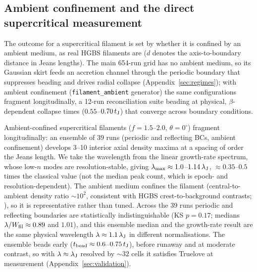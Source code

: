 \documentclass[usenatbib,twoside,twocolumn]{mnras}
\begin{document}
\subsection{Ambient confinement and the direct supercritical measurement}
\label{sec:modecompetition}

The outcome for a supercritical filament is set by whether it is confined by an ambient medium, as real HGBS filaments are ($d$ denotes the axis-to-boundary distance in Jeans lengths). The main 654-run grid has no ambient medium, so its Gaussian skirt feeds an accretion channel through the periodic boundary that suppresses beading and drives radial collapse (Appendix~\ref{sec:regimes}); with ambient confinement (\texttt{filament\_ambient} generator) the same configurations fragment longitudinally, a 12-run reconciliation suite beading at physical, $\beta$-dependent collapse times ($0.55$--$0.70\,t_{\rm J}$) that converge across boundary conditions.

Ambient-confined supercritical filaments ($f=1.5$--$2.0$, $\theta=0^\circ$) fragment longitudinally: an ensemble of 39 runs (periodic and reflecting BCs, ambient confinement) develops 3--10 interior axial density maxima at a spacing of order the Jeans length. We take the wavelength from the linear growth-rate spectrum, whose low-$n$ modes are resolution-stable, giving $\lambda_{\rm max}\approx1.0$--$1.14\,\lambda_{\rm J}$, $\approx0.35$--$0.5$ times the classical value (not the median peak count, which is epoch- and resolution-dependent). The ambient medium confines the filament (central-to-ambient density ratio $\sim10^2$, consistent with HGBS crest-to-background contrasts; \citealt{Arzoumanian2019}), so it is representative rather than tuned. Across the 39 runs periodic and reflecting boundaries are statistically indistinguishable (KS $p=0.17$; medians $\lambda/W_{\rm fil}\approx0.89$ and $1.01$), and this ensemble median and the growth-rate result are the same physical wavelength $\lambda\approx1.1\,\lambda_{\rm J}$ in different normalisations. The ensemble beads early ($t_{\rm bead}\approx0.6$--$0.75\,t_{\rm J}$), before runaway and at moderate contrast, so with $\lambda\approx\lambda_{\rm J}$ resolved by ${\sim}32$ cells it satisfies Truelove at measurement (Appendix~\ref{sec:validation}).
\end{document}
